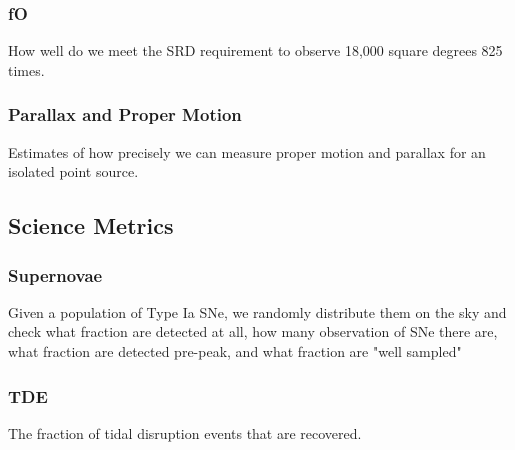 \subsubsection{fO}

How well do we meet the SRD requirement to observe 18,000 square degrees 825 times.



\subsubsection{Parallax and Proper Motion}

Estimates of how precisely we can measure proper motion and parallax for an isolated point source.


\subsection{Science Metrics}

\subsubsection{Supernovae}

Given a population of Type Ia SNe, we randomly distribute them on the sky and check what fraction are detected at all, how many observation of SNe there are, what fraction are detected pre-peak, and what fraction are "well sampled"


\subsubsection{TDE}

The fraction of tidal disruption events that are recovered.


